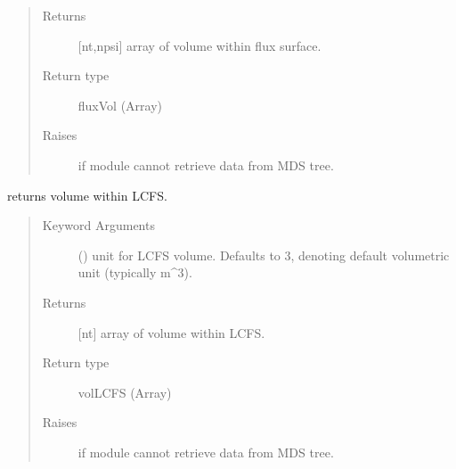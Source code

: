 \documentclass[letterpaper,10pt,english]{sphinxmanual}
\begin{document}
\begin{fulllineitems}
\begin{fulllineitems}
\begin{quote}
\begin{description}
\item[{Returns}] \leavevmode
{[}nt,npsi{]} array of volume within flux surface.

\item[{Return type}] \leavevmode
fluxVol (Array)

\item[{Raises}] \leavevmode
{} \textendash{} if module cannot retrieve data from MDS tree.

\end{description}\end{quote}

\end{fulllineitems}


\begin{fulllineitems}
\label{\detokenize{eqtools:eqtools.EFIT.EFITTree.getVolLCFS}}
returns volume within LCFS.
\begin{quote}\begin{description}
\item[{Keyword Arguments}] \leavevmode
{} () \textendash{} unit for LCFS volume.  Defaults to 3,
denoting default volumetric unit (typically m\textasciicircum{}3).

\item[{Returns}] \leavevmode
{[}nt{]} array of volume within LCFS.

\item[{Return type}] \leavevmode
volLCFS (Array)

\item[{Raises}] \leavevmode
{} \textendash{} if module cannot retrieve data from MDS tree.

\end{description}\end{quote}

\end{fulllineitems}



\end{fulllineitems}
\end{document}
